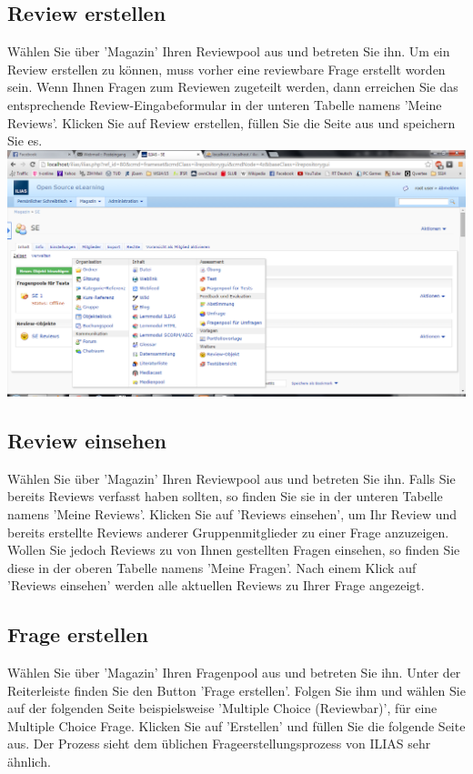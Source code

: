 \documentclass[12pt,a4paper]{scrreprt}
\begin{document}
\subsection{Review erstellen}
Wählen Sie über 'Magazin' Ihren Reviewpool aus und betreten Sie ihn. Um ein Review erstellen zu können, muss vorher eine reviewbare Frage erstellt worden sein. Wenn Ihnen Fragen zum Reviewen zugeteilt werden, dann erreichen Sie das entsprechende Review-Eingabeformular in der unteren Tabelle namens 'Meine Reviews'. Klicken Sie auf Review erstellen, füllen Sie die Seite aus und speichern Sie es. \\		
\includegraphics[width=1.0\textwidth]{reviewpool_erstellen.png}
		
\subsection{Review einsehen}
Wählen Sie über 'Magazin' Ihren Reviewpool aus und betreten Sie ihn. Falls Sie bereits Reviews verfasst haben sollten, so finden Sie sie in der unteren Tabelle namens 'Meine Reviews'. Klicken Sie auf 'Reviews einsehen', um Ihr Review und bereits erstellte Reviews anderer Gruppenmitglieder zu einer Frage anzuzeigen. Wollen Sie jedoch Reviews zu von Ihnen gestellten Fragen einsehen, so finden Sie diese in der oberen Tabelle namens 'Meine Fragen'. Nach einem Klick auf 'Reviews einsehen' werden alle aktuellen Reviews zu Ihrer Frage angezeigt.

\subsection{Frage erstellen}
Wählen Sie über 'Magazin' Ihren Fragenpool aus und betreten Sie ihn. Unter der Reiterleiste finden Sie den Button 'Frage erstellen'. Folgen Sie ihm und wählen Sie auf der folgenden Seite beispielsweise 'Multiple Choice (Reviewbar)', für eine Multiple Choice Frage. Klicken Sie auf 'Erstellen' und füllen Sie die folgende Seite aus. Der Prozess sieht dem üblichen Frageerstellungsprozess von ILIAS sehr ähnlich. 
		
\end{document}

